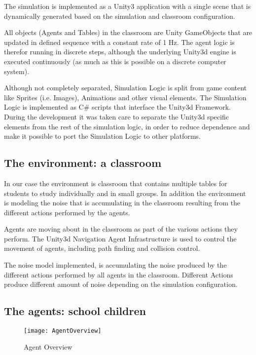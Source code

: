 The simulation is implemented as a Unity3 application with a single scene that is
dynamically generated based on the simulation and classroom configuration.

All objects (Agents and Tables) in the classroom are Unity GameObjects that are
updated in defined sequence with a constant rate of 1 Hz. The agent logic is therefor
running in discrete steps, although the underlying Unity3d engine is executed
continuously (as much as this is possible on a discrete computer system).

Although not completely separated, Simulation Logic is split from game content
like Sprites (i.e. Images), Animations and other visual elements. The Simulation
Logic is implemented as C\# scripts that interface the Unity3d Framework.
During the development it was taken care to separate the Unity3d specific elements
from the rest of the simulation logic, in order to reduce dependence and make it
possible to port the Simulation Logic to other platforms.

\subsection{The environment: a classroom}
In our case the environment is classroom that contains multiple tables for
students to study individually and in small groups. In addition the environment
is modeling the noise that is accumulating in the classroom resulting from the
different actions performed by the agents.

Agents are moving about in the classroom as part of the various actions they perform.
The Unity3d Navigation Agent Infrastructure is used to control the movement of agents,
including path finding and collision control.

The noise model implemented, is accumulating the noise produced by the different actions
performed by all agents in the classroom. Different Actions produce different amount
of noise depending on the simulation configuration.

\label{agent}
\subsection{The agents: school children}

\begin{figure}[]
    \centering
    \texttt{[image: AgentOverview]}
    \caption{Agent Overview}
    \label{AgentOverview}
\end{figure}

